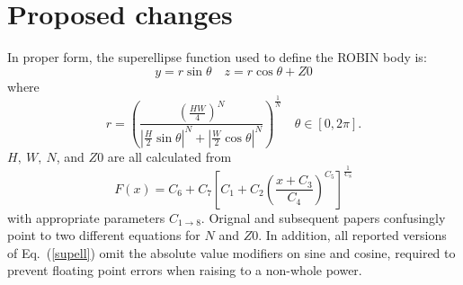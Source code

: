 \documentclass[journal]{new-aiaa}
\begin{document}
\section{Proposed changes}
In proper form, the superellipse function used to define the ROBIN body is:
\begin{equation}
   y=r \sin \theta \quad z=r \cos \theta +Z0
\end{equation} 
where
\begin{equation}
  r=\left(\frac{\left(\frac{HW}{4}\right)^{N}}{|\frac{H}{2}\sin \theta|^{N}+|\frac{W}{2}\cos \theta|^{N}}\right)^{\frac{1}{N}} \quad \theta\in[0,2\pi].
\label{supell}
\end{equation}
$H, \ W, \ N$, and $Z0$ are all calculated from
\begin{equation}
  F\left(x\right) = C_{6}+C_{7}\left[C_{1}+C_{2}\left(\frac{x+C_{3}}{C_{4}}\right)^{C_{5}}\right]^{\frac{1}{C_{8}}}
\end{equation}
with appropriate parameters $C_{1 \to 8}$.
Orignal \cite{nasa80051} and subsequent \cite{nasa87762} papers confusingly point to two different equations
for $N$ and $Z0$.
In addition, all reported versions of Eq.~(\ref{supell}) omit the absolute value modifiers on sine and cosine,
required to prevent floating point errors when raising to a non-whole power.
\end{document}
